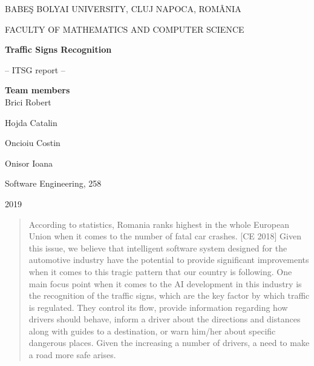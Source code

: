 \documentclass[runningheads,a4paper,11pt]{report}
\begin{document}
\begin{titlepage}
\sloppy
\begin{center}
BABE\c S BOLYAI UNIVERSITY, CLUJ NAPOCA, ROM\^ ANIA

FACULTY OF MATHEMATICS AND COMPUTER SCIENCE

\vspace{6cm}

\Huge \textbf{Traffic Signs Recognition}

\vspace{1cm}

\normalsize -- ITSG report --

\end{center}


\vspace{4cm}

\begin{flushright}
\Large{\textbf{Team members}}\\
Brici Robert

Hojda Catalin

Oncioiu Costin

Onisor Ioana

Software Engineering, 258
\end{flushright}

\vspace{4cm}

\begin{center}
2019
\end{center}

\end{titlepage}


\begin{abstract}
	According to statistics, Romania ranks highest in the whole European Union when it comes to the number of fatal car crashes. [CE 2018] Given this issue, we believe that intelligent software system designed for the automotive industry have the potential to provide significant improvements when it comes to this tragic pattern that our country is following. 
One main focus point when it comes to the AI development in this industry is the recognition of the traffic signs, which are the key factor by which traffic is regulated. They control its flow, provide information regarding how drivers should behave, inform a driver about the directions and distances along with guides to a destination, or warn him/her about specific dangerous places. Given the increasing a number of drivers, a need to make a road more safe arises.
\end{abstract}
\end{document}
